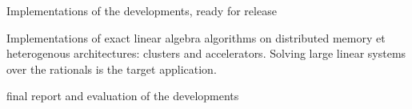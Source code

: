 \begin{workpackage}
\begin{wpdelivs}
\begin{wpdeliv}[due=47,id=GAP-software-final,dissem=PU,nature=OTHER,lead=SA]
      {Implementations of the \GAP developments, ready for release}
  \end{wpdeliv}
  \begin{wpdeliv}[due=48,id=LinBox-distributed,dissem=PU,nature=DEM, lead=UJF]
    {Implementations of exact linear algebra algorithms on distributed memory et heterogenous
      architectures: clusters and accelerators. Solving large linear systems
      over the rationals is the target application.} 
  \end{wpdeliv}
  \begin{wpdeliv}[due=48,id=GAP-APIs-report,dissem=PU,nature=R,lead=SA]
      {final report and evaluation of the \GAP developments}
  \end{wpdeliv}
\end{wpdelivs}
\end{workpackage}


